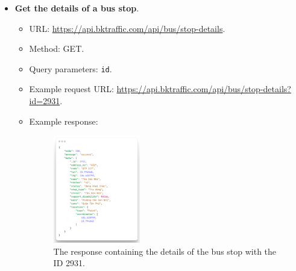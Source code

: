 \begin{itemize}
    \item \textbf{Get the details of a bus stop}.
    \begin{itemize}
        \item URL: \url{https://api.bktraffic.com/api/bus/stop-details}.
        \item Method: GET.
        \item Query parameters: \lstinline{id}.
        \item Example request URL: \url{https://api.bktraffic.com/api/bus/stop-details?id=2931}.
        \item Example response:
        \begin{figure}[H]
            \centering
            \includegraphics[width=0.38\textwidth]{assets/images/Implementation/stop_detail_response.png}
            \caption{The response containing the details of the bus stop with the ID 2931.}
            \label{fig:stop_detail_response}
        \end{figure}
    \end{itemize}


\end{itemize}
